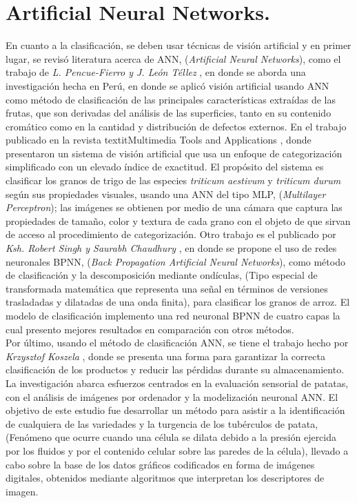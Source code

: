 \section{Artificial Neural Networks.}
En cuanto a la clasificación, se deben usar técnicas de visión artificial y en primer lugar, se revisó literatura  acerca de ANN, (\textit{Artificial Neural Networks}), como el trabajo de \textit{L. Pencue-Fierro y J. León Téllez} \cite{article2}, en donde se aborda una investigación hecha en Perú, en donde se aplicó visión artificial usando ANN como método de clasificación de las principales características extraídas de las frutas, que son derivadas del análisis de las superficies, tanto en su contenido cromático como en la cantidad y distribución de defectos externos. En el trabajo publicado en la revista textit{Multimedia Tools and Applications} \cite{Shrivastava2017}, donde presentaron un sistema de visión artificial que usa un enfoque de categorización simplificado con un elevado índice de exactitud. El propósito del sistema es clasificar los granos de trigo de las especies \textit{triticum aestivum} y \textit{triticum durum} según sus propiedades visuales, usando una ANN del tipo MLP, (\textit{Multilayer Perceptron}); las imágenes se obtienen por medio de una cámara que captura las propiedades de tamaño, color y textura de cada grano con el objeto de que sirvan de acceso al procedimiento de categorización. Otro trabajo es el publicado por \textit{Ksh. Robert Singh y Saurabh Chaudhury} \cite{Singh2016}, en donde se propone el uso de redes neuronales BPNN, (\textit{Back Propagation Artificial Neural Networks}), como método de clasificación y la descomposición mediante ondículas, (Tipo especial de transformada matemática que representa una señal en términos de versiones trasladadas y dilatadas de una onda finita), para clasificar los granos de arroz. El modelo de clasificación implemento una red neuronal BPNN de cuatro capas la cual presento mejores resultados en comparación con otros métodos.\\

Por último, usando el método de clasificación ANN, se tiene el trabajo hecho por \textit{Krzysztof Koszela} \cite{Przybyl2019}, donde se presenta una forma para garantizar la correcta clasificación de los productos y reducir las pérdidas durante su almacenamiento. La investigación abarca esfuerzos centrados en la evaluación sensorial de patatas, con el análisis de imágenes por ordenador y la modelización neuronal ANN. El objetivo de este estudio fue desarrollar un método para asistir a la identificación de cualquiera de las variedades y la turgencia de los tubérculos de patata, (Fenómeno que ocurre cuando una célula se dilata debido a la presión ejercida por los fluidos y por el contenido celular sobre las paredes de la célula), llevado a cabo sobre la base de los datos gráficos codificados en forma de imágenes digitales, obtenidos mediante algoritmos que interpretan los descriptores de imagen.\\

